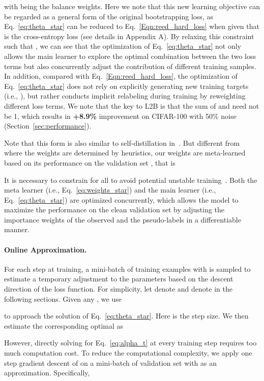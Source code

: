 \documentclass{article}
\begin{document}
with  being the balance weights. 
Here we note that this new learning objective can be regarded as a general form of the original bootstrapping loss, as Eq.~\eqref{eq:theta_star} can be reduced to Eq.~\eqref{Eqn:reed_hard_loss} when  given that  is the cross-entropy loss (see details in Appendix A).
By relaxing this constraint such that , we can see that the optimization of Eq.~\eqref{eq:theta_star} not only allows the main learner to explore the optimal combination between the two loss terms but also concurrently adjust the contribution of different training samples.
In addition, compared with Eq.~\eqref{Eqn:reed_hard_loss}, the optimization of Eq.~\eqref{eq:theta_star} does not rely on explicitly generating new training targets (i.e., ), but rather conducts implicit relabeling during training by reweighting different loss terms.
We note that the key to L2B is that the sum of  and  need not be 1, which results in \textbf{+8.9\%} improvement on CIFAR-100 with 50\% noise (Section~\ref{sec:performance}).

Note that this form is also similar to self-distillation in~\cite{li2017learning}. But different from~\cite{li2017learning} where the weights are determined by heuristics, our weights  are meta-learned based on its performance on the validation set , that is

It is necessary to constrain  for all  to avoid potential unstable training~\cite{ren2018learning}.
Both the meta learner (i.e., Eq.~\eqref{eq:weights_star}) and the main learner (i.e., Eq.~\eqref{eq:theta_star}) are optimized concurrently, which allows the model to maximize the performance on the clean validation set  by adjusting the importance weights of the observed and the pseudo-labels in a differentiable manner.


\paragraph{Online Approximation.}
For each step  at training, a mini-batch of training examples  with  is sampled to estimate a temporary adjustment to the parameters based on the descent direction of the loss function. 
For simplicity, let  denote  and  denote  in the following sections.
Given any , we use 

to approach the solution of Eq.~\eqref{eq:theta_star}. Here  is the step size. We then estimate the corresponding optimal  as





However, directly solving for Eq.~\eqref{eq:alpha_t} at every training step requires too much computation cost. To reduce the computational complexity, we apply one step gradient descent of  on a mini-batch of validation set  with  as an approximation. Specifically,
\end{document}
